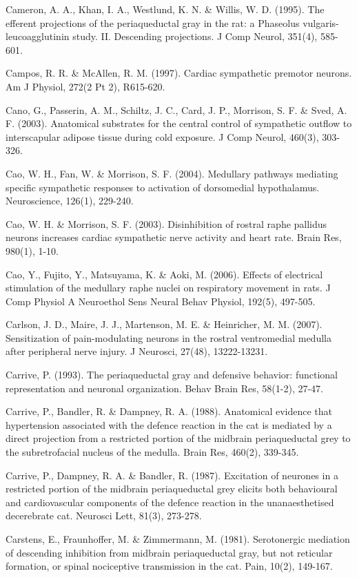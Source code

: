 \documentclass[a4paper,12pt,twoside]{report}
\begin{document}
\begin{singlespacing}
\begin{footnotesize}
Cameron, A. A., Khan, I. A., Westlund, K. N. \& Willis, W. D. (1995). The efferent projections of the periaqueductal gray in the rat: a Phaseolus vulgaris-leucoagglutinin study. II. Descending projections. J Comp Neurol, 351(4), 585-601.

Campos, R. R. \& McAllen, R. M. (1997). Cardiac sympathetic premotor neurons. Am J Physiol, 272(2 Pt 2), R615-620.

Cano, G., Passerin, A. M., Schiltz, J. C., Card, J. P., Morrison, S. F. \& Sved, A. F. (2003). Anatomical substrates for the central control of sympathetic outflow to interscapular adipose tissue during cold exposure. J Comp Neurol, 460(3), 303-326.

Cao, W. H., Fan, W. \& Morrison, S. F. (2004). Medullary pathways mediating specific sympathetic responses to activation of dorsomedial hypothalamus. Neuroscience, 126(1), 229-240.

Cao, W. H. \& Morrison, S. F. (2003). Disinhibition of rostral raphe pallidus neurons increases cardiac sympathetic nerve activity and heart rate. Brain Res, 980(1), 1-10.

Cao, Y., Fujito, Y., Matsuyama, K. \& Aoki, M. (2006). Effects of electrical stimulation of the medullary raphe nuclei on respiratory movement in rats. J Comp Physiol A Neuroethol Sens Neural Behav Physiol, 192(5), 497-505.

Carlson, J. D., Maire, J. J., Martenson, M. E. \& Heinricher, M. M. (2007). Sensitization of pain-modulating neurons in the rostral ventromedial medulla after peripheral nerve injury. J Neurosci, 27(48), 13222-13231.

Carrive, P. (1993). The periaqueductal gray and defensive behavior: functional representation and neuronal organization. Behav Brain Res, 58(1-2), 27-47.

Carrive, P., Bandler, R. \& Dampney, R. A. (1988). Anatomical evidence that hypertension associated with the defence reaction in the cat is mediated by a direct projection from a restricted portion of the midbrain periaqueductal grey to the subretrofacial nucleus of the medulla. Brain Res, 460(2), 339-345.

Carrive, P., Dampney, R. A. \& Bandler, R. (1987). Excitation of neurones in a restricted portion of the midbrain periaqueductal grey elicits both behavioural and cardiovascular components of the defence reaction in the unanaesthetised decerebrate cat. Neurosci Lett, 81(3), 273-278.

Carstens, E., Fraunhoffer, M. \& Zimmermann, M. (1981). Serotonergic mediation of descending inhibition from midbrain periaqueductal gray, but not reticular formation, or spinal nociceptive transmission in the cat. Pain, 10(2), 149-167.


\end{footnotesize}
\end{singlespacing}
\end{document}
